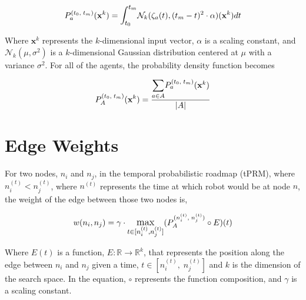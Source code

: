 \documentclass{article}
\newcommand{\Normal}[2]{\mathcal{N}_k(#1, #2)}
\newcommand{\n}[2]{\ensuremath{n^{(#2)}_{#1}}}
\newcommand{\PA}{\ensuremath{P^{(\n{i}{t},\;\n{j}{t})}_{A}}}
\newcommand{\PD}{\ensuremath{P^{(t_0,\;t_m)}_{a}}}
\newcommand{\PAll}{\ensuremath{P^{(t_0,\;t_m)}_{A}}}
\begin{document}
$$\PD(\mathbf{x}^k) = \mathlarger{\int_{t_0}^{t_m}}\Normal{\zeta_a(t)}{(t_m -
t)^2 \cdot \alpha}(\mathbf{x}^k)dt$$

Where $\mathbf{x}^k$ represents the $k$-dimensional input vector, $\alpha$ is a
scaling constant, and $\mathcal{N}_k(\mu, \sigma^2)$ is a $k$-dimensional
Gaussian distribution centered at $\mu$ with a variance $\sigma^2$. For all of
the agents, the probability density function becomes

$$\PAll(\mathbf{x}^k) = \frac{\mathlarger{\sum_{a \in A}}
\PD(\mathbf{x}^k)}{|A|}$$

\section{Edge Weights}

For two nodes, $n_i$ and $n_j$, in the temporal probabilistic roadmap (tPRM),
where $\n{i}{t} < \n{j}{t}$, where $n^{(t)}$ represents the time at which robot
would be at node $n$, the weight of the edge between those two nodes is,

$$w(n_i, n_j) = \gamma \cdot \mathlarger{\max_{t \in [\n{i}{t},
    \n{j}{t}]}}(\PA \circ E)(t)$$

Where $E(t)$ is a function, $E: \mathbb{R} \to \mathbb{R}^k$, that represents
the position along the edge between $n_i$ and $n_j$ given a time, $t
\in [\n{i}{t},\;\n{j}{t}]$ and $k$ is the dimension of the search space. In the
equation, $\circ$ represents the function composition, and $\gamma$ is a
scaling constant.
\end{document}
